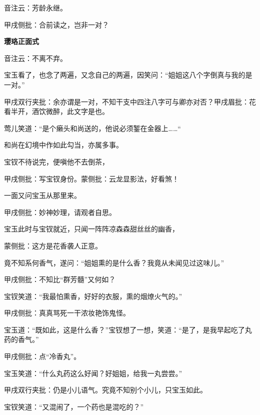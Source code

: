 \begin{parag}
    音注云：芳龄永继。\begin{note}甲戌侧批：合前读之，岂非一对？\end{note}
\end{parag}


\begin{parag}
    \textbf{璎珞正面式}
\end{parag}


\begin{parag}
    音注云：不离不弃。
\end{parag}


\begin{parag}
    宝玉看了，也念了两遍，又念自己的两遍，因笑问：“姐姐这八个字倒真与我的是一对。”\begin{note}甲戌双行夹批：余亦谓是一对，不知干支中四注八字可与卿亦对否？甲戌眉批：花看半开，酒饮微醉，此文字是也。\end{note}莺儿笑道：“是个癞头和尚送的，他说必须錾在金器上……“\begin{note}和尚在幻境中作如此勾当，亦属多事。\end{note}宝钗不待说完，便嗔他不去倒茶，\begin{note}甲戌侧批：写宝钗身份。蒙侧批：云龙显影法，好看煞！\end{note}一面又问宝玉从那里来。\begin{note}甲戌侧批：妙神妙理，请观者自思。\end{note}
\end{parag}


\begin{parag}
    宝玉此时与宝钗就近，只闻一阵阵凉森森甜丝丝的幽香，\begin{note}蒙侧批：这方是花香袭人正意。\end{note}竟不知系何香气，遂问：“姐姐熏的是什么香？我竟从未闻见过这味儿。”\begin{note}甲戌侧批：不知比“群芳髓”又何如？\end{note}宝钗笑道：“我最怕熏香，好好的衣服，熏的烟燎火气的。”\begin{note}甲戌侧批：真真骂死一干浓妆艳饰鬼怪。\end{note}宝玉道：“既如此，这是什么香？”宝钗想了一想，笑道：“是了，是我早起吃了丸药的香气。”\begin{note}甲戌侧批：点“冷香丸”。\end{note}宝玉笑道：“什么丸药这么好闻？好姐姐，给我一丸尝尝。”\begin{note}甲戌双行夹批：仍是小儿语气。究竟不知别个小儿，只宝玉如此。\end{note}宝钗笑道：“又混闹了，一个药也是混吃的？”
\end{parag}


